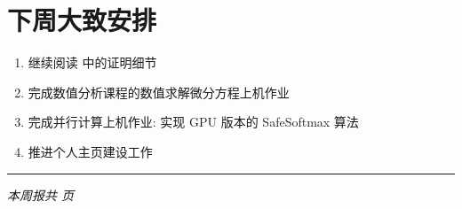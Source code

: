 \documentclass[12pt,a4paper]{article}
\begin{document}
\section{下周大致安排}

\begin{enumerate}
    \item 继续阅读 \cite{bayati_dynamics_2011} 中的证明细节
    \item 完成数值分析课程的数值求解微分方程上机作业
    \item 完成并行计算上机作业: 实现 GPU 版本的 SafeSoftmax 算法
    \item 推进个人主页建设工作
\end{enumerate}

\vspace{1cm}
\noindent\rule{\textwidth}{0.5pt}


\begin{center}
\textit{本周报共 \pageref{LastPage} 页}
\end{center}
\end{document}

